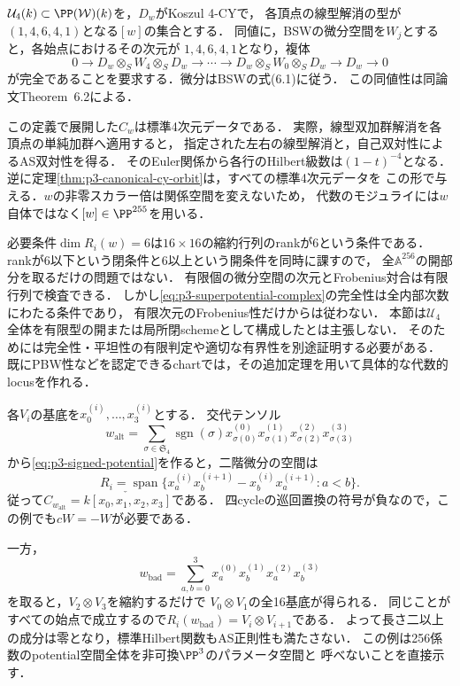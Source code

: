 \begin{definition}[許容potentialの集合]
\label{def:p3-admissible-potentials}
$\mathcal U_4(k)\subset\PP(\mathcal W)(k)$を，$D_w$がKoszul 4-CYで，
各頂点の線型解消の型が$(1,4,6,4,1)$となる$[w]$の集合とする．
同値に，BSWの微分空間を$W_j$とすると，各始点におけるその次元が
$1,4,6,4,1$となり，複体
\begin{equation}\label{eq:p3-superpotential-complex}
 0\longrightarrow D_w\otimes_S W_4\otimes_S D_w
 \longrightarrow\cdots\longrightarrow
 D_w\otimes_S W_0\otimes_S D_w
 \longrightarrow D_w\longrightarrow0
\end{equation}
が完全であることを要求する．微分はBSWの式(6.1)に従う．
この同値性は同論文Theorem~6.2による．
\end{definition}

この定義で展開した$C_w$は標準4次元データである．
実際，線型双加群解消を各頂点の単純加群へ適用すると，
指定された左右の線型解消と，自己双対性によるAS双対性を得る．
そのEuler関係から各行のHilbert級数は$(1-t)^{-4}$となる．
逆に定理\ref{thm:p3-canonical-cy-orbit}は，すべての標準4次元データを
この形で与える．$w$の非零スカラー倍は関係空間を変えないため，
代数のモジュライには$w$自体ではなく$[w]\in\PP^{255}$を用いる．

\begin{remark}[有限係数表示と正則locus]
必要条件$\dim R_i(w)=6$は$16\times16$の縮約行列のrankが6という条件である．
rankが6以下という閉条件と6以上という開条件を同時に課すので，
全$\mathbb A^{256}$の開部分を取るだけの問題ではない．
有限個の微分空間の次元とFrobenius対合は有限行列で検査できる．
しかし\eqref{eq:p3-superpotential-complex}の完全性は全内部次数にわたる条件であり，
有限次元のFrobenius性だけからは従わない．
本節は$\mathcal U_4$全体を有限型の開または局所閉schemeとして構成したとは主張しない．
そのためには完全性・平坦性の有限判定や適切な有界性を別途証明する必要がある．
既にPBW性などを認定できるchartでは，その追加定理を用いて具体的な代数的locusを作れる．
\end{remark}

\begin{remark}[可換例と正則性を満たさないpotential]
\label{ex:p3-potential-examples}
各$V_i$の基底を$x_0^{(i)},\ldots,x_3^{(i)}$とする．
交代テンソル
\[
 w_{\mathrm{alt}}=
 \sum_{\sigma\in\mathfrak S_4}\operatorname{sgn}(\sigma)
 x_{\sigma(0)}^{(0)}x_{\sigma(1)}^{(1)}
 x_{\sigma(2)}^{(2)}x_{\sigma(3)}^{(3)}
\]
から\eqref{eq:p3-signed-potential}を作ると，二階微分の空間は
\[
 R_i=\operatorname{span}
 \{x_a^{(i)}x_b^{(i+1)}-x_b^{(i)}x_a^{(i+1)}:a<b\}.
\]
従って$C_{w_{\mathrm{alt}}}=\check{k[x_0,x_1,x_2,x_3]}$である．
四cycleの巡回置換の符号が負なので，この例でも$cW=-W$が必要である．

一方，
\[
 w_{\mathrm{bad}}=\sum_{a,b=0}^3
 x_a^{(0)}x_b^{(1)}x_a^{(2)}x_b^{(3)}
\]
を取ると，$V_2\otimes V_3$を縮約するだけで
$V_0\otimes V_1$の全16基底が得られる．
同じことがすべての始点で成立するので$R_i(w_{\mathrm{bad}})=V_i\otimes V_{i+1}$である．
よって長さ二以上の成分は零となり，標準Hilbert関数もAS正則性も満たさない．
この例は256係数のpotential空間全体を非可換$\PP^3$のパラメータ空間と
呼べないことを直接示す．
\end{remark}

